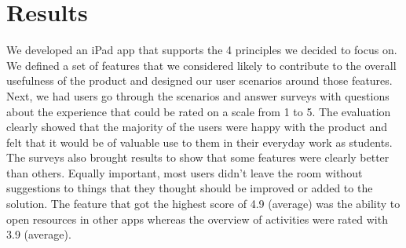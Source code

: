 \section{Results}
We developed an iPad app that supports the 4 principles we decided to focus on. We defined a set of features that we considered likely to contribute to the overall usefulness of the product and designed our user scenarios around those features. Next, we had users go through the scenarios and answer surveys with questions about the experience that could be rated on a scale from 1 to 5.
The evaluation clearly showed that the majority of the users were happy with the product and felt that it would be of valuable use to them in their everyday work as students. The surveys also brought results to show that some features were clearly better than others. Equally important, most users didn't leave the room without suggestions to things that they thought should be improved or added to the solution. The feature that got the highest score of 4.9 (average) was the ability to open resources in other apps whereas the overview of activities were rated with 3.9 (average).
